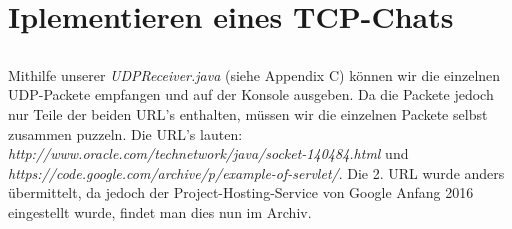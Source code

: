 \documentclass{scrartcl}
\begin{document}
    \subsection{}
    \label{sub:4.3}

  \section{Iplementieren eines TCP-Chats}
  \label{sec:Iplementieren eines TCP-Chats}
    \subsection{}
    \label{sub:5.1}
      Mithilfe unserer \textit{UDPReceiver.java} (siehe Appendix C) können wir
      die einzelnen UDP-Packete empfangen und auf der Konsole ausgeben.
      Da die Packete jedoch nur Teile der beiden URL's enthalten, müssen wir
      die einzelnen Packete selbst zusammen puzzeln. Die URL's lauten:
      \textit{http://www.oracle.com/technetwork/java/socket-140484.html} und\\
      \textit{https://code.google.com/archive/p/example-of-servlet/}. Die
      2. URL wurde anders übermittelt, da jedoch der Project-Hosting-Service
      von Google Anfang 2016 eingestellt wurde, findet man dies nun im Archiv.
\end{document}
